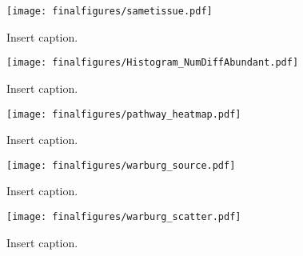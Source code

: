 \documentclass[10pt]{article}
\begin{document}
\begin{figure}[ht!]
  \centering
     \texttt{[image: finalfigures/sametissue.pdf]}
  \caption{Insert caption.}
     \label{fig:SIFig_SameTissue}
\end{figure}

\begin{figure}[ht!]
  \centering
     \texttt{[image: finalfigures/Histogram\_NumDiffAbundant.pdf]}
  \caption{Insert caption.}
     \label{fig:SIFig_HistogramDiffAbundance}
\end{figure}
 

\begin{figure}[ht!]
  \centering
     \texttt{[image: finalfigures/pathway\_heatmap.pdf]}
  \caption{Insert caption.}
     \label{fig:SIFig_PathwayHeatmap}
\end{figure}

\begin{figure}[ht!]
  \centering
     \texttt{[image: finalfigures/warburg\_source.pdf]}
  \caption{Insert caption.}
     \label{fig:SIFig_WarburgSource}
\end{figure}

\begin{figure}[ht!]
  \centering
     \texttt{[image: finalfigures/warburg\_scatter.pdf]}
  \caption{Insert caption.}
     \label{fig:SIFig_WarburgScatter}
\end{figure}

 
\end{document}
